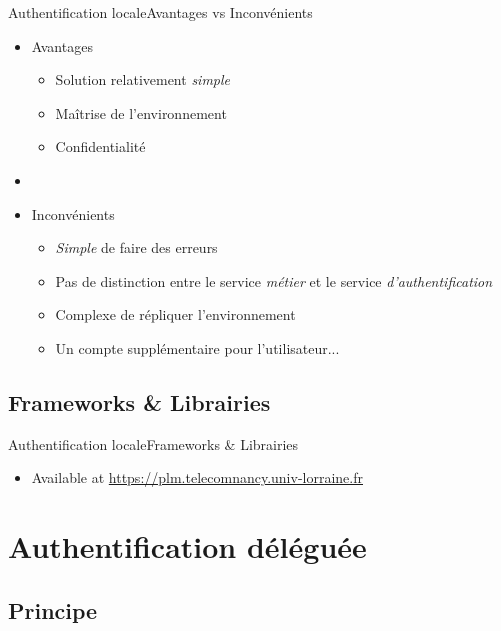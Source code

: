 \documentclass{beamer}
\begin{document}
\begin{frame}{Authentification locale}{Avantages vs Inconvénients}
  \begin{center}
    \begin{itemize}
      \item Avantages
      \begin{itemize}
        \item Solution relativement \emph{simple}
        \item Maîtrise de l'environnement
        \item Confidentialité
      \end{itemize}
      \pause
      \item[~]
      \item Inconvénients
      \begin{itemize}
        \item \emph{Simple} de faire des erreurs
        \item Pas de distinction entre le service \emph{métier} et le service \emph{d'authentification}
        \item Complexe de répliquer l'environnement
        \item Un compte supplémentaire pour l'utilisateur...
      \end{itemize}
    \end{itemize}
  \end{center}
\end{frame}

\subsection{Frameworks \& Librairies}

\begin{frame}{Authentification locale}{Frameworks \& Librairies}
  \begin{center}
    \begin{itemize}
    \item Available at \url{https://plm.telecomnancy.univ-lorraine.fr}
    \end{itemize}
  \end{center}
\end{frame}

\section{Authentification déléguée}

\subsection{Principe}
\end{document}
